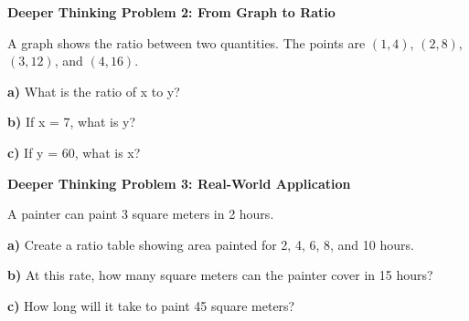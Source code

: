 \documentclass[12pt, letterpaper, fleqn]{article}
\begin{document}
\begin{tcolorbox}[colback=white!15, colframe=black, boxrule=1.5pt, arc=4mm, left=6mm, right=6mm, top=5mm, bottom=5mm]

\textbf{Deeper Thinking Problem 2: From Graph to Ratio}

\medskip

\noindent
A graph shows the ratio between two quantities. The points are $(1,4)$, $(2,8)$, $(3,12)$, and $(4,16)$.

\noindent
\textbf{a)} What is the ratio of x to y?

\vspace{1.5cm}

\noindent
\textbf{b)} If x = 7, what is y?

\vspace{1.5cm}

\noindent
\textbf{c)} If y = 60, what is x?

\vspace{1.8cm}

\end{tcolorbox}

\vspace{0.5cm}

\begin{tcolorbox}[colback=white!15, colframe=black, boxrule=1.5pt, arc=4mm, left=6mm, right=6mm, top=5mm, bottom=5mm]

\textbf{Deeper Thinking Problem 3: Real-World Application}

\medskip

\noindent
A painter can paint 3 square meters in 2 hours.

\noindent
\textbf{a)} Create a ratio table showing area painted for 2, 4, 6, 8, and 10 hours.

\vspace{2.5cm}

\noindent
\textbf{b)} At this rate, how many square meters can the painter cover in 15 hours?

\vspace{1.5cm}

\noindent
\textbf{c)} How long will it take to paint 45 square meters?

\vspace{1.8cm}

\end{tcolorbox}
\end{document}
